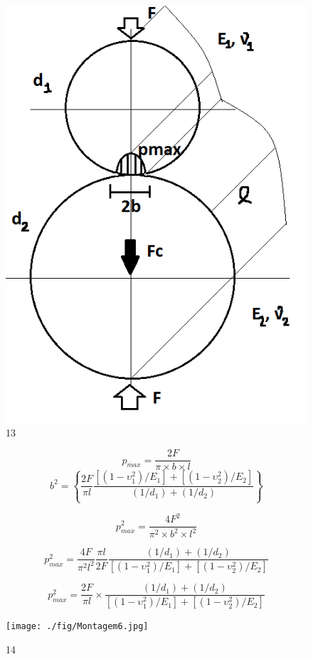 \documentclass[a4paper, 12pt]{article}
\begin{document}
\begin{figure}[h]
\begin{center}
\includegraphics[scale=0.4]{./fig/10.png}
\caption{\label{fig:13}13} 
\end{center}
\end{figure}

\[p_{max} = \frac{2F}{\pi \times b \times l}\]
\[
b^{2} = \left\{    \frac{2F}{\pi l} \frac{[(1-\upsilon_{1}^{2})/E_{1}]+[(1-\upsilon_{2}^{2})/E_{2}]}{(1/d_{1})+(1/d_{2})}     \right\}\]

\[p_{max}^{2}=\frac{4F^{2}}{\pi ^{2} \times b^{2} \times l^{2}}\]

\[p_{max}^{2}=\frac{4F}{\pi ^{2} l^{2}} \frac{ \pi l}{2F} \frac{(1/d_{1})+(1/d_{2})}{[(1-\upsilon_{1}^{2})/E_{1}]+[(1-\upsilon_{2}^{2})/E_{2}]}\]

\[p_{max}^{2}=\frac{2F}{\pi l} \times \frac{(1/d_{1})+(1/d_{2})}{[(1-\upsilon_{1}^{2})/E_{1}]+[(1-\upsilon_{2}^{2})/E_{2}]}\]

\begin{figure}[h]
\begin{center}
\texttt{[image: ./fig/Montagem6.jpg]}
\caption{\label{fig:14}14} 
\end{center}
\end{figure}
\end{document}
